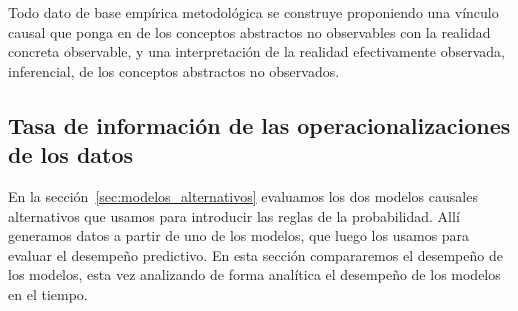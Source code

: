 \documentclass[a4paper,11pt]{book}
\theoremstyle{definition}
\begin{document}

Todo dato de base emp\'irica metodol\'ogica se construye proponiendo una v\'inculo causal que ponga en de los conceptos abstractos no observables con la realidad concreta observable, y una interpretaci\'on de la realidad efectivamente observada, inferencial, de los conceptos abstractos no observados.

\subsection{Tasa de informaci\'on de las operacionalizaciones de los datos} \label{sec:tasa_de_informacion}

En la secci\'on~\ref{sec:modelos_alternativos} evaluamos los dos modelos causales alternativos que usamos para introducir las reglas de la probabilidad.
%
All\'i generamos datos a partir de uno de los modelos, que luego los usamos para evaluar el desempe\~no predictivo.
%
En esta secci\'on compararemos el desempe\~no de los modelos, esta vez analizando de forma anal\'itica el desempe\~no de los modelos en el tiempo.

\end{document}
